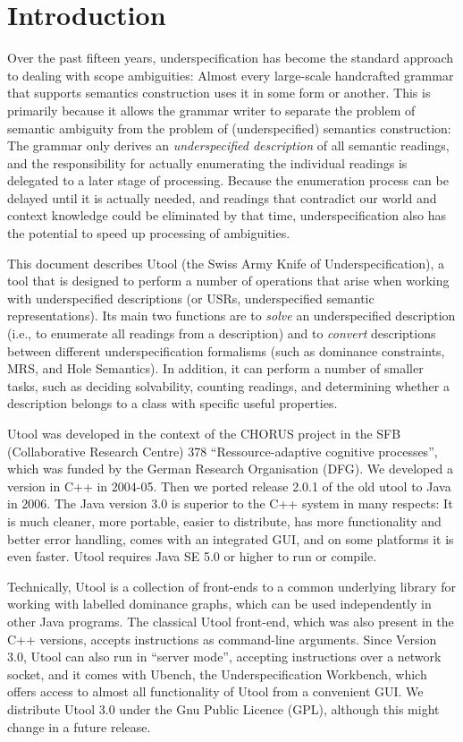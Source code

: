 
\section{Introduction}  \label{sec:introduction}

Over the past fifteen years, underspecification has become the
standard approach to dealing with scope ambiguities: Almost every
large-scale handcrafted grammar that supports semantics construction
uses it in some form or another. This is primarily because it allows
the grammar writer to separate the problem of semantic ambiguity from
the problem of (underspecified) semantics construction: The grammar
only derives an \emph{underspecified description} of all semantic
readings, and the responsibility for actually enumerating the
individual readings is delegated to a later stage of
processing. Because the enumeration process can be delayed until it is
actually needed, and readings that contradict our world and context
knowledge could be eliminated by that time, underspecification also
has the potential to speed up processing of ambiguities.

This document describes Utool (the Swiss Army Knife of
Underspecification), a tool that is designed to perform a number of
operations that arise when working with underspecified descriptions
(or USRs, underspecified semantic representations). Its main two
functions are to \emph{solve} an underspecified description (i.e., to
enumerate all readings from a description) and to \emph{convert}
descriptions between different underspecification formalisms (such as
dominance constraints, MRS, and Hole Semantics). In addition, it can
perform a number of smaller tasks, such as deciding solvability,
counting readings, and determining whether a description belongs to a
class with specific useful properties.

Utool was developed in the context of the CHORUS project in the SFB
(Collaborative Research Centre) 378 ``Ressource-adaptive cognitive
processes'', which was funded by the German Research Organisation
(DFG). We developed a version in C++ in 2004-05. Then we ported
release 2.0.1 of the old utool to Java in 2006. The Java version 3.0
is superior to the C++ system in many respects: It is much cleaner,
more portable, easier to distribute, has more functionality and better
error handling, comes with an integrated GUI, and on some platforms it
is even faster. Utool requires Java SE 5.0 or higher to run or
compile.

Technically, Utool is a collection of front-ends to a common
underlying library for working with labelled dominance graphs, which
can be used independently in other Java programs. The classical Utool
front-end, which was also present in the C++ versions, accepts
instructions as command-line arguments. Since Version 3.0, Utool can
also run in ``server mode'', accepting instructions over a network
socket, and it comes with Ubench, the Underspecification Workbench,
which offers access to almost all functionality of Utool from a
convenient GUI. We distribute Utool 3.0 under the Gnu Public Licence
(GPL), although this might change in a future release.

